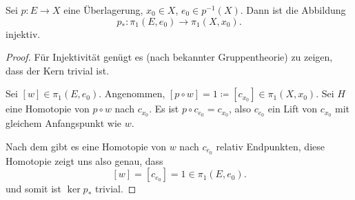 \begin{theorem}\label{thm:morphismus-von-fundamentalgruppen-bei-überlagerung-ist-trivial}
    Sei $p\colon  E \to  X$ eine Überlagerung, $x_0\in X$, $e_0\in p^{-1} (X)$. Dann ist die Abbildung
    \[
        p_*\colon  \pi_1(E,e_0) \to  \pi_1(X,x_0)
    .\] 
    injektiv.
\end{theorem}
\begin{proof}
    Für Injektivität genügt es (nach bekannter Gruppentheorie) zu zeigen, dass der Kern trivial ist.

Sei $[w]\in \pi_1(E,e_0)$. Angenommen, $[p \circ  w] = 1 \coloneqq [c_{x_0}]\in \pi_1(X,x_0)$. Sei $H$ eine Homotopie von  $p \circ  w$ nach $c_{x_0}$. Es ist $p \circ  c_{e_0} = c_{x_0}$, also $c_{e_0}$ ein Lift von $c_{x_0}$ mit gleichem Anfangspunkt wie $w$.

Nach dem  gibt es eine Homotopie von $w$ nach  $c_{e_0}$ relativ Endpunkten, diese Homotopie zeigt uns also genau, dass
\[
    [w] = [c_{e_0}]  = 1 \in \pi_1(E,e_0)
.\] 
und somit ist $\ker p_*$ trivial.
\end{proof}

